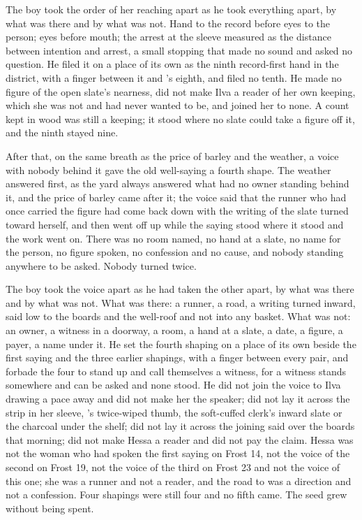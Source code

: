 The boy took the order of her reaching apart as he took everything apart, by what was there and by what was not. Hand to the record before eyes to the person; eyes before mouth; the arrest at the sleeve measured as the distance between intention and arrest, a small stopping that made no sound and asked no question. He filed it on a place of its own as the ninth record-first hand in the district, with a finger between it and 's eighth, and filed no tenth. He made no figure of the open slate's nearness, did not make Ilva a reader of her own keeping, which she was not and had never wanted to be, and joined her to none. A count kept in wood was still a keeping; it stood where no slate could take a figure off it, and the ninth stayed nine.

After that, on the same breath as the price of barley and the weather, a voice with nobody behind it gave the old well-saying a fourth shape. The weather answered first, as the yard always answered what had no owner standing behind it, and the price of barley came after it; the voice said that the runner who had once carried the figure had come back down  with the writing of the slate turned toward herself, and then went off up  while the saying stood where it stood and the work went on. There was no room named, no hand at a slate, no name for the person, no figure spoken, no confession and no cause, and nobody standing anywhere to be asked. Nobody turned twice.

The boy took the voice apart as he had taken the other apart, by what was there and by what was not. What was there: a runner, a road, a writing turned inward, said low to the boards and the well-roof and not into any basket. What was not: an owner, a witness in a doorway, a room, a hand at a slate, a date, a figure, a payer, a name under it. He set the fourth shaping on a place of its own beside the first saying and the three earlier shapings, with a finger between every pair, and forbade the four to stand up and call themselves a witness, for a witness stands somewhere and can be asked and none stood. He did not join the voice to Ilva drawing a pace away and did not make her the speaker; did not lay it across the strip in her sleeve, 's twice-wiped thumb, the soft-cuffed clerk's inward slate or the charcoal under the shelf; did not lay it across the joining said over the boards that morning; did not make Hessa a reader and did not pay the claim. Hessa was not the woman who had spoken the first saying on Frost 14, not the voice of the second on Frost 19, not the voice of the third on Frost 23 and not the voice of this one; she was a runner and not a reader, and the road to  was a direction and not a confession. Four shapings were still four and no fifth came. The seed grew without being spent.

